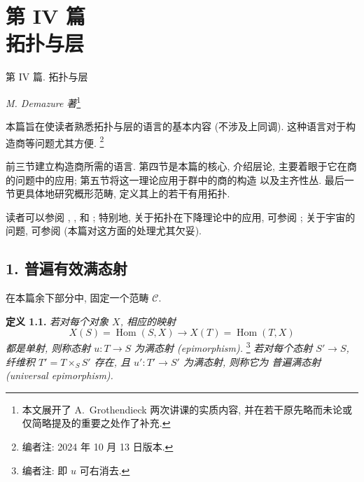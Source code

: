
\setcounter{footnote}{0}
\chapter*{第 IV 篇\\拓扑与层}
%
  {第 IV 篇. 拓扑与层}

\begingroup
\renewcommand{\thefootnote}{\fnsymbol{footnote}}
\begin{center}
  \textit{M. Demazure 著}\footnote{本文展开了 A.~Grothendieck 两次讲课的实质内容,
  并在若干原先略而未论或仅简略提及的重要之处作了补充.}
\end{center}
\endgroup

\setcounter{footnote}{-1}

本篇旨在使读者熟悉拓扑与层的语言的基本内容 (不涉及上同调).
这种语言对于构造商等问题尤其方便.
\footnote{编者注: 2024 年 10 月 13 日版本.}

前三节建立构造商所需的语言. 第四节是本篇的核心, 介绍层论,
主要着眼于它在商的问题中的应用; 第五节将这一理论应用于群中的商的构造
以及主齐性丛. 最后一节更具体地研究概形范畴, 定义其上的若干有用拓扑.

读者可以参阅 ,
, 
和 ; 特别地,
关于拓扑在下降理论中的应用, 可参阅 ;
关于宇宙的问题, 可参阅 
(本篇对这方面的处理尤其欠妥).

\section*{1. 普遍有效满态射}

在本篇余下部分中, 固定一个范畴 \(\mathscr C\).

\medskip
\noindent{}\textbf{定义 1.1.}
\textit{若对每个对象 \(X\), 相应的映射}
\[
  X(S)=\operatorname{Hom}(S,X)
  \longrightarrow
  X(T)=\operatorname{Hom}(T,X)
\]
\textit{都是单射, 则称态射 \(u:T\to S\) 为\emph{满态射 (epimorphism)}.}
\footnote{编者注: 即 \(u\) 可右消去.}
\textit{若对每个态射 \(S'\to S\), 纤维积 \(T'=T\times_S S'\)
存在, 且 \(u':T'\to S'\) 为满态射, 则称它为
\emph{普遍满态射 (universal epimorphism)}.}

